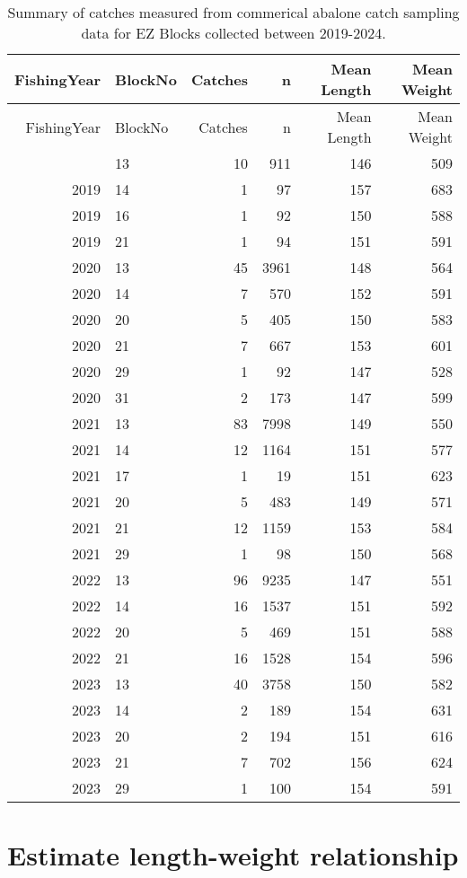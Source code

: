 \documentclass[
  11pt,
]{article}
\begin{document}
\begin{longtable}[]{@{}rlrrrr@{}}
\caption{Summary of catches measured from commerical abalone catch
sampling data for EZ Blocks collected between 2019-2024.}\tabularnewline
\toprule\noalign{}
FishingYear & BlockNo & Catches & n & Mean Length & Mean Weight \\
\midrule\noalign{}
\endfirsthead
\toprule\noalign{}
FishingYear & BlockNo & Catches & n & Mean Length & Mean Weight \\
\midrule\noalign{}
\endhead
\bottomrule\noalign{}
\endlastfoot
2019 & 13 & 10 & 911 & 146 & 509 \\
2019 & 14 & 1 & 97 & 157 & 683 \\
2019 & 16 & 1 & 92 & 150 & 588 \\
2019 & 21 & 1 & 94 & 151 & 591 \\
2020 & 13 & 45 & 3961 & 148 & 564 \\
2020 & 14 & 7 & 570 & 152 & 591 \\
2020 & 20 & 5 & 405 & 150 & 583 \\
2020 & 21 & 7 & 667 & 153 & 601 \\
2020 & 29 & 1 & 92 & 147 & 528 \\
2020 & 31 & 2 & 173 & 147 & 599 \\
2021 & 13 & 83 & 7998 & 149 & 550 \\
2021 & 14 & 12 & 1164 & 151 & 577 \\
2021 & 17 & 1 & 19 & 151 & 623 \\
2021 & 20 & 5 & 483 & 149 & 571 \\
2021 & 21 & 12 & 1159 & 153 & 584 \\
2021 & 29 & 1 & 98 & 150 & 568 \\
2022 & 13 & 96 & 9235 & 147 & 551 \\
2022 & 14 & 16 & 1537 & 151 & 592 \\
2022 & 20 & 5 & 469 & 151 & 588 \\
2022 & 21 & 16 & 1528 & 154 & 596 \\
2023 & 13 & 40 & 3758 & 150 & 582 \\
2023 & 14 & 2 & 189 & 154 & 631 \\
2023 & 20 & 2 & 194 & 151 & 616 \\
2023 & 21 & 7 & 702 & 156 & 624 \\
2023 & 29 & 1 & 100 & 154 & 591 \\
\end{longtable}

\section{Estimate length-weight
relationship}\label{estimate-length-weight-relationship}
\end{document}
